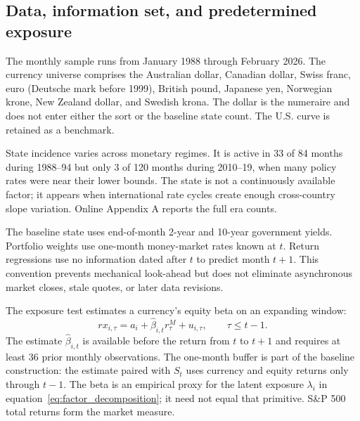 \subsection{Data, information set, and predetermined exposure}

The monthly sample runs from January 1988 through February 2026. The currency universe comprises the Australian dollar, Canadian dollar, Swiss franc, euro (Deutsche mark before 1999), British pound, Japanese yen, Norwegian krone, New Zealand dollar, and Swedish krona. The dollar is the numeraire and does not enter either the sort or the baseline state count. The U.S. curve is retained as a benchmark.

State incidence varies across monetary regimes. It is active in 33 of 84 months during 1988--94 but only 3 of 120 months during 2010--19, when many policy rates were near their lower bounds. The state is not a continuously available factor; it appears when international rate cycles create enough cross-country slope variation. Online Appendix A reports the full era counts.

The baseline state uses end-of-month 2-year and 10-year government yields. Portfolio weights use one-month money-market rates known at $t$. Return regressions use no information dated after $t$ to predict month $t+1$. This convention prevents mechanical look-ahead but does not eliminate asynchronous market closes, stale quotes, or later data revisions.

The exposure test estimates a currency's equity beta on an expanding window:
\begin{equation}
    rx_{i,\tau}=a_i+\widehat\beta_{i,t}r^M_{\tau}+u_{i,\tau},
    \qquad \tau\leq t-1.
    \label{eq:currency_beta}
\end{equation}
The estimate $\widehat\beta_{i,t}$ is available before the return from $t$ to $t+1$ and requires at least 36 prior monthly observations. The one-month buffer is part of the baseline construction: the estimate paired with $S_t$ uses currency and equity returns only through $t-1$. The beta is an empirical proxy for the latent exposure $\lambda_i$ in equation~\eqref{eq:factor_decomposition}; it need not equal that primitive. S\&P 500 total returns form the market measure.

